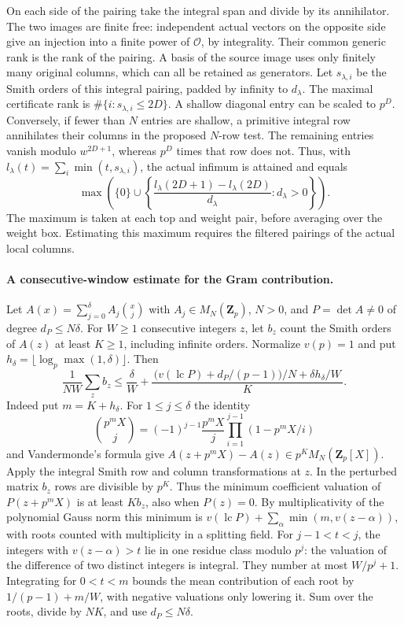 On each side of the pairing take the integral span and divide by
its annihilator. The two images are finite free: independent actual
vectors on the opposite side give an injection into a finite power
of \(\mathcal O\), by integrality. Their common generic rank is the
rank of the pairing. A basis of the source image uses only finitely
many original columns, which can all be retained as generators.
Let \(s_{\lambda,i}\) be the Smith orders of this integral pairing,
padded by infinity to \(d_\lambda\). The maximal certificate rank is
\(\#\{i:s_{\lambda,i}\le 2D\}\). A shallow diagonal entry can be
scaled to \(p^D\). Conversely, if fewer than \(N\) entries are
shallow, a primitive integral row annihilates their columns in the
proposed \(N\)-row test. The remaining entries vanish modulo
\(w^{2D+1}\), whereas \(p^D\) times that row does not. Thus,
with \(l_\lambda(t)=\sum_i\min(t,s_{\lambda,i})\), the actual
infimum is attained and equals
\[
  \max\!\left(\{0\}\cup
       \left\{\frac{l_\lambda(2D+1)-l_\lambda(2D)}{d_\lambda}
                     : d_\lambda>0\right\}\right).
\]
The maximum is taken at each top and weight pair, before averaging
over the weight box. Estimating this maximum requires the filtered
pairings of the actual local columns.

\paragraph{A consecutive-window estimate for the Gram contribution.}
Let \(A(x)=\sum_{j=0}^{\delta}A_j\binom{x}{j}\) with
\(A_j\in M_N(\mathbf Z_p)\), \(N>0\), and \(P=\det A\ne0\) of
degree \(d_P\le N\delta\). For \(W\ge1\) consecutive integers \(z\),
let \(b_z\) count the Smith orders of \(A(z)\) at least \(K\ge1\),
including infinite orders. Normalize \(v(p)=1\) and put
\(h_\delta=\lfloor\log_p\max(1,\delta)\rfloor\). Then
\[
 \frac{1}{NW}\sum_z b_z
 \le \frac{\delta}{W}+
 \frac{\,\big(v(\operatorname{lc}P)+d_P/(p-1)\big)/N
                +\delta h_\delta/W\,}{K}.
\]
Indeed put \(m=K+h_\delta\). For \(1\le j\le\delta\) the identity
\[
  \binom{p^m X}{j}
     =(-1)^{j-1}\frac{p^m X}{j}
                    \prod_{i=1}^{j-1}(1-p^mX/i)
\]
and Vandermonde's formula give
\(A(z+p^mX)-A(z)\in p^K M_N(\mathbf Z_p[X])\).
Apply the integral Smith row and column transformations at \(z\).
In the perturbed matrix \(b_z\) rows are divisible by \(p^K\).
Thus the minimum coefficient valuation of \(P(z+p^mX)\) is at
least \(K b_z\), also when \(P(z)=0\). By multiplicativity of the
polynomial Gauss norm this minimum is
\(v(\operatorname{lc}P)+\sum_{\alpha}\min(m,v(z-\alpha))\),
with roots counted with multiplicity in a splitting field.
For \(j-1<t<j\), the integers with \(v(z-\alpha)>t\) lie in one
residue class modulo \(p^j\): the valuation of the difference of
two distinct integers is integral. They number at most \(W/p^j+1\).
Integrating for \(0<t<m\) bounds the mean contribution of each
root by \(1/(p-1)+m/W\), with negative valuations only lowering it.
Sum over the roots, divide by \(NK\), and use \(d_P\le N\delta\).

